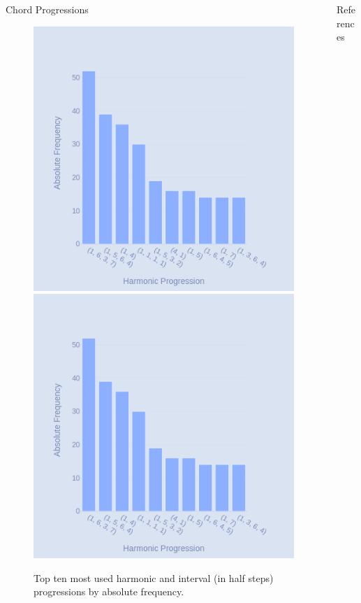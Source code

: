 \begin{frame}[t]
\begin{columns}
\begin{column}{0.49\textwidth}
\begin{block}{Chord Progressions}
\begin{figure}[hbt!]
        \includegraphics{./figures/1.png} \hspace{0.5cm} \includegraphics{./figures/1.png}
        \caption{Top ten most used harmonic and interval (in half steps) progressions by absolute frequency.}
        \label{fig:harmony}
    \end{figure}

    \end{block}
    \end{column}
\begin{column}{0.49\textwidth}
    \begin{block}{References}
        \printbibliography
    \end{block}
\end{column}
\end{columns}


\end{frame}
